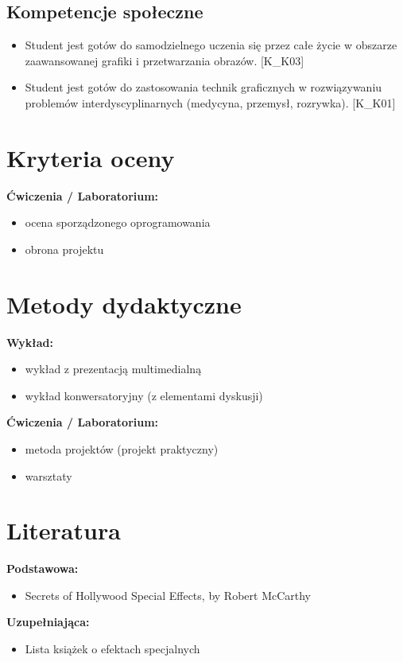 \documentclass[12pt, a4paper]{article}
\begin{document}
\subsection*{Kompetencje społeczne}
\begin{itemize}
  \item Student jest gotów do samodzielnego uczenia się przez całe życie w obszarze zaawansowanej grafiki i przetwarzania obrazów. [K\_K03]
  \item Student jest gotów do zastosowania technik graficznych w rozwiązywaniu problemów interdyscyplinarnych (medycyna, przemysł, rozrywka). [K\_K01]
\end{itemize}

\section{Kryteria oceny}

\textbf{Ćwiczenia / Laboratorium:}
\begin{itemize}
  \item ocena sporządzonego oprogramowania
  \item obrona projektu
\end{itemize}


\section{Metody dydaktyczne}

\textbf{Wykład:}
\begin{itemize}
  \item wykład z prezentacją multimedialną
  \item wykład konwersatoryjny (z elementami dyskusji)
\end{itemize}
\vspace{4pt}
\textbf{Ćwiczenia / Laboratorium:}
\begin{itemize}
  \item metoda projektów (projekt praktyczny)
  \item warsztaty
\end{itemize}
\vspace{4pt}


\section{Literatura}

\textbf{Podstawowa:}
\begin{itemize}
  \item Secrets of Hollywood Special Effects, by Robert McCarthy
\end{itemize}

\textbf{Uzupełniająca:}
\begin{itemize}
  \item Lista książek o efektach specjalnych
\end{itemize}
\end{document}
